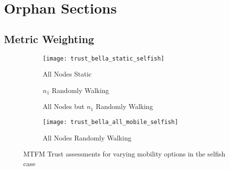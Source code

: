 
\chapter{Orphan Sections}
\label{AppendixA}

\section{Metric Weighting}
\begin{figure}
\begin{subfigure}{.5\textwidth}
  \centering
  \texttt{[image: trust\_bella\_static\_selfish]}
  \caption{All Nodes Static}
  \label{fig:selfish_trust_static}
\end{subfigure}%
\begin{subfigure}{.5\textwidth}
  \centering
  \caption{$n_1$ Randomly Walking}
  \label{fig:selfish_trust_single}
\end{subfigure}
\begin{subfigure}{.5\textwidth}
\centering
  \caption{All Nodes but $n_1$ Randomly Walking}
  \label{fig:selfish_trust_allbut1}
\end{subfigure}
\begin{subfigure}{.5\textwidth}
\centering
  \texttt{[image: trust\_bella\_all\_mobile\_selfish]}
  \caption{All Nodes Randomly Walking}
  \label{fig:selfish_trust_all_mobile}
\end{subfigure}
\caption{MTFM Trust assessments for varying mobility options in the selfish case}
\label{fig:trust_mobility}
\end{figure}



